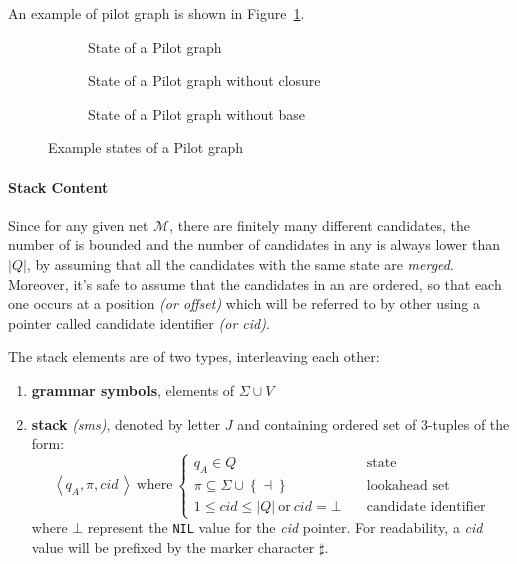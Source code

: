 \documentclass[english]{article}
\begin{document}
An example of pilot graph is shown in Figure~\ref{fig:pilot-graph}.

\begin{figure}[htbp]
  \centering
  \bigskip
  \begin{subfigure}{0.99\textwidth}
    \centering
    \caption{State of a Pilot graph}
  \end{subfigure}
  \bigskip
  \begin{subfigure}{0.495\textwidth}
    \centering
    \caption{State of a Pilot graph without closure}
  \end{subfigure}
  \begin{subfigure}{0.495\textwidth}
    \centering
    \caption{State of a Pilot graph without base}
  \end{subfigure}
  \bigskip

  \caption{Example states of a Pilot graph}
  \label{fig:pilot-graph}
\end{figure}

\paragraph{Stack Content}
\label{par:stack-content}

Since for any given net \(\mathcal{M}\), there are finitely many different candidates, the number of \mstates is bounded and the number of candidates in any \mstate is always lower than \(| Q |\), by assuming that all the candidates with the same state are \textit{merged}.
Moreover, it's safe to assume that the candidates in an \mstate are ordered, so that each one occurs at a position \textit{(or offset)} which will be referred to by other \mstates using a pointer called candidate identifier \textit{(or cid)}.

The stack elements are of two types, interleaving each other:

\begin{enumerate}
  \item \textbf{grammar symbols}, elements of \(\Sigma \cup V\)
  \item \textbf{stack \mstates} \textit{(sms)}, denoted by letter \(J\) and containing ordered set of \(3\)-tuples of the form:
        \[ \left\langle q_A, \pi, \textit{cid} \, \right\rangle \ \text{where} \ \begin{cases}
            q_A \in Q \quad                                                        & \text{state}                \\
            \pi \subseteq \Sigma \cup \left\{ \dashv \right\} \quad                & \text{lookahead set}        \\
            1 \leq \textit{cid} \leq | Q | \ \text{or} \ \textit{cid} = \bot \quad & \text{candidate identifier}
          \end{cases} \]
        where \(\bot\) represent the \texttt{NIL} value for the \textit{cid} pointer.
        For readability, a \textit{cid} value will be prefixed by the marker character \(\sharp\).
\end{enumerate}
\end{document}
